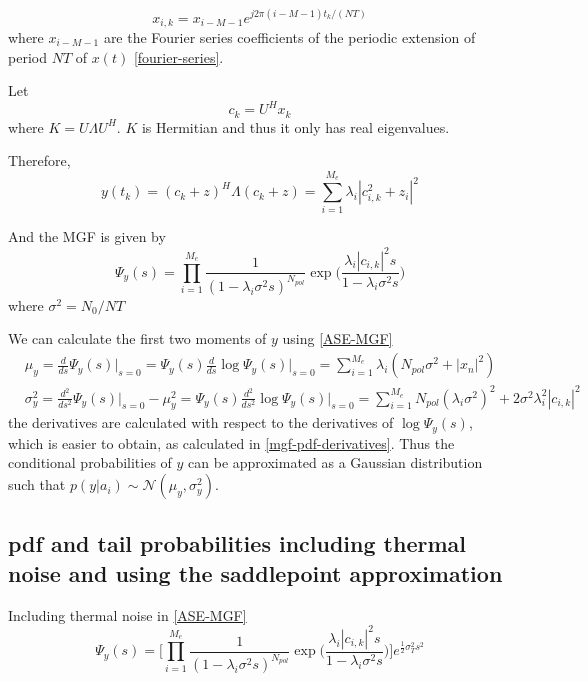 \documentclass[a4paper]{article}
\begin{document}
\begin{equation}
x_{i, k} = x_{i - M - 1}e^{j2\pi(i-M-1)t_k/(NT)}
\end{equation}
where $x_{i - M - 1}$ are the Fourier series coefficients of the periodic extension of period $NT$ of $x(t)$ \eqref{fourier-series}.

Let 
\begin{equation}
c_k = U^Hx_k
\end{equation}
where $K = U\Lambda U^H$. $K$ is Hermitian and thus it only has real eigenvalues.

Therefore,
\begin{equation}
y(t_k) = (c_k + z)^H\Lambda (c_k + z) = \sum_{i = 1}^{M_e} \lambda_i|c_{i, k}^2 + z_i|^2
\end{equation}

And the MGF is given by
\begin{equation} \label{ASE-MGF}
\Psi_y(s) = \prod_{i =1}^{M_e}\frac{1}{(1-\lambda_i\sigma^2s)^{N_{pol}}}\exp\bigg(\frac{\lambda_i|c_{i,k}|^2s}{1-\lambda_i\sigma^2s}\bigg)
\end{equation}
where $\sigma^2 = N_0/{NT}$

We can calculate the first two moments of $y$ using \eqref{ASE-MGF}
\begin{align}
& \mu_y = \frac{d}{ds}\Psi_y(s)\bigg|_{s=0} = \Psi_y(s)\frac{d}{ds}\log\Psi_y(s)\bigg|_{s=0} = \sum_{i=1}^{M_e} \lambda_i(N_{pol}\sigma^2 + |x_n|^2) \\
& \sigma_{y}^2 = \frac{d^2}{ds^2}\Psi_y(s)\bigg|_{s=0} -\mu_y^2 = \Psi_y(s)\frac{d^2}{ds^2}\log\Psi_y(s)\bigg|_{s=0} = \sum_{i =1}^{M_e} N_{pol}(\lambda_i\sigma^2)^2 + 2\sigma^2\lambda_i^2|c_{i,k}|^2
\end{align}
the derivatives are calculated with respect to the derivatives of $\log\Psi_y(s)$, which is easier to obtain, as calculated in \eqref{mgf-pdf-derivatives}. Thus the conditional probabilities of $y$ can be approximated as a Gaussian distribution such that $p(y|a_i) \sim \mathcal{N}(\mu_y, \sigma_y^2)$.

\subsection{pdf and tail probabilities including thermal noise and using the saddlepoint approximation}

Including thermal noise in \eqref{ASE-MGF}
\begin{equation}
\Psi_y(s) = \bigg[\prod_{i =1}^{M_e}\frac{1}{(1-\lambda_i\sigma^2s)^{N_{pol}}}\exp\bigg(\frac{\lambda_i|c_{i,k}|^2s}{1-\lambda_i\sigma^2s}\bigg)\bigg]e^{\frac{1}{2}\sigma_{T}^2s^2}
\end{equation}
\end{document}
